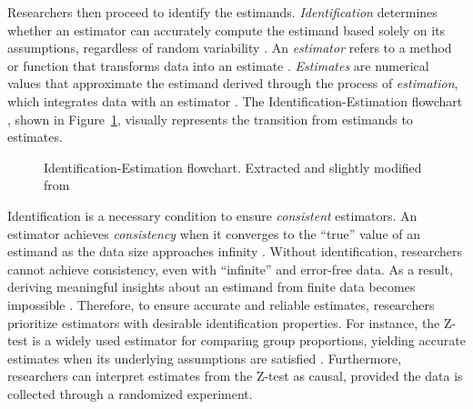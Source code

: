 \documentclass[
  authoryear,
  review,
  1p]{elsarticle}
\begin{document}
Researchers then proceed to identify the estimands.
\emph{Identification} determines whether an estimator can accurately
compute the estimand based solely on its assumptions, regardless of
random variability \citep[pp.~4]{Schuessler_et_al_2023}. An
\emph{estimator} refers to a method or function that transforms data
into an estimate \citep{Neal_2020}. \emph{Estimates} are numerical
values that approximate the estimand derived through the process of
\emph{estimation}, which integrates data with an estimator
\citep{Everitt_et_al_2010}. The Identification-Estimation flowchart
\citep{McElreath_2020, Neal_2020}, shown in Figure~\ref{fig-IEflow},
visually represents the transition from estimands to estimates.

\begin{figure}


\caption{\label{fig-IEflow}Identification-Estimation flowchart.
Extracted and slightly modified from \citet[pp.~32]{Neal_2020}}

\end{figure}%

Identification is a necessary condition to ensure \emph{consistent}
estimators. An estimator achieves \emph{consistency} when it converges
to the ``true'' value of an estimand as the data size approaches
infinity \citep{Everitt_et_al_2010}. Without identification, researchers
cannot achieve consistency, even with ``infinite'' and error-free data.
As a result, deriving meaningful insights about an estimand from finite
data becomes impossible \citep[pp.~5]{Schuessler_et_al_2023}. Therefore,
to ensure accurate and reliable estimates, researchers prioritize
estimators with desirable identification properties. For instance, the
Z-test is a widely used estimator for comparing group proportions,
yielding accurate estimates when its underlying assumptions are
satisfied \citep{Kanji_2006}. Furthermore, researchers can interpret
estimates from the Z-test as causal, provided the data is collected
through a randomized experiment.
\end{document}
